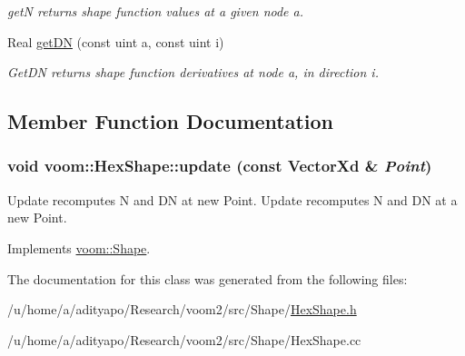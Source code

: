 \begin{DoxyCompactItemize}
\begin{DoxyCompactList}\small\item\em getN returns shape function values at a given node a. \item\end{DoxyCompactList}\item 
\hypertarget{classvoom_1_1_hex_shape_afdb11f3450c7b92608bbe8332961032d}{
Real \hyperlink{classvoom_1_1_hex_shape_afdb11f3450c7b92608bbe8332961032d}{getDN} (const uint a, const uint i)}
\label{classvoom_1_1_hex_shape_afdb11f3450c7b92608bbe8332961032d}

\begin{DoxyCompactList}\small\item\em GetDN returns shape function derivatives at node a, in direction i. \item\end{DoxyCompactList}\end{DoxyCompactItemize}


\subsection{Member Function Documentation}
\hypertarget{classvoom_1_1_hex_shape_a62e0194dcc933cede6fcde41e9cfcd1f}{
\subsubsection[{update}]{\setlength{\rightskip}{0pt plus 5cm}void voom::HexShape::update (const VectorXd \& {\em Point})}}
\label{classvoom_1_1_hex_shape_a62e0194dcc933cede6fcde41e9cfcd1f}


Update recomputes N and DN at new Point. Update recomputes N and DN at a new Point. 

Implements \hyperlink{classvoom_1_1_shape_a8ded544de12647543b056cec61be9f26}{voom::Shape}.

The documentation for this class was generated from the following files:\begin{DoxyCompactItemize}
\item 
/u/home/a/adityapo/Research/voom2/src/Shape/\hyperlink{_hex_shape_8h}{HexShape.h}\item 
/u/home/a/adityapo/Research/voom2/src/Shape/HexShape.cc\end{DoxyCompactItemize}
